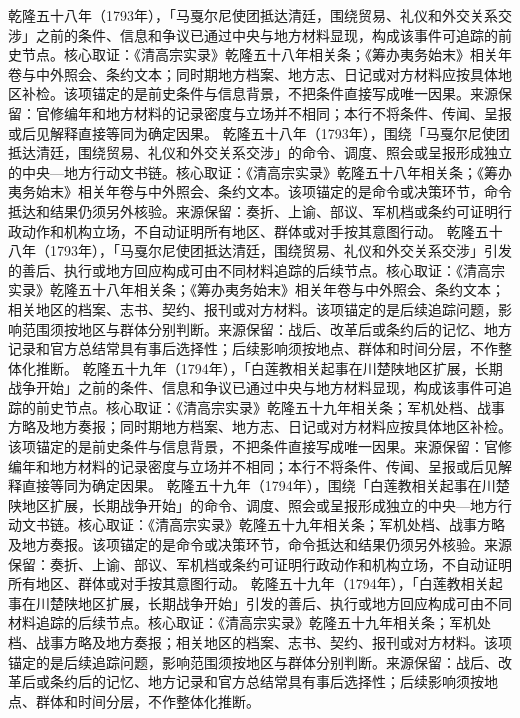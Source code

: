 乾隆五十八年（1793年），「马戛尔尼使团抵达清廷，围绕贸易、礼仪和外交关系交涉」之前的条件、信息和争议已通过中央与地方材料显现，构成该事件可追踪的前史节点。核心取证：《清高宗实录》乾隆五十八年相关条；《筹办夷务始末》相关年卷与中外照会、条约文本；同时期地方档案、地方志、日记或对方材料应按具体地区补检。该项锚定的是前史条件与信息背景，不把条件直接写成唯一因果。来源保留：官修编年和地方材料的记录密度与立场并不相同；本行不将条件、传闻、呈报或后见解释直接等同为确定因果。
乾隆五十八年（1793年），围绕「马戛尔尼使团抵达清廷，围绕贸易、礼仪和外交关系交涉」的命令、调度、照会或呈报形成独立的中央—地方行动文书链。核心取证：《清高宗实录》乾隆五十八年相关条；《筹办夷务始末》相关年卷与中外照会、条约文本。该项锚定的是命令或决策环节，命令抵达和结果仍须另外核验。来源保留：奏折、上谕、部议、军机档或条约可证明行政动作和机构立场，不自动证明所有地区、群体或对手按其意图行动。
乾隆五十八年（1793年），「马戛尔尼使团抵达清廷，围绕贸易、礼仪和外交关系交涉」引发的善后、执行或地方回应构成可由不同材料追踪的后续节点。核心取证：《清高宗实录》乾隆五十八年相关条；《筹办夷务始末》相关年卷与中外照会、条约文本；相关地区的档案、志书、契约、报刊或对方材料。该项锚定的是后续追踪问题，影响范围须按地区与群体分别判断。来源保留：战后、改革后或条约后的记忆、地方记录和官方总结常具有事后选择性；后续影响须按地点、群体和时间分层，不作整体化推断。
乾隆五十九年（1794年），「白莲教相关起事在川楚陕地区扩展，长期战争开始」之前的条件、信息和争议已通过中央与地方材料显现，构成该事件可追踪的前史节点。核心取证：《清高宗实录》乾隆五十九年相关条；军机处档、战事方略及地方奏报；同时期地方档案、地方志、日记或对方材料应按具体地区补检。该项锚定的是前史条件与信息背景，不把条件直接写成唯一因果。来源保留：官修编年和地方材料的记录密度与立场并不相同；本行不将条件、传闻、呈报或后见解释直接等同为确定因果。
乾隆五十九年（1794年），围绕「白莲教相关起事在川楚陕地区扩展，长期战争开始」的命令、调度、照会或呈报形成独立的中央—地方行动文书链。核心取证：《清高宗实录》乾隆五十九年相关条；军机处档、战事方略及地方奏报。该项锚定的是命令或决策环节，命令抵达和结果仍须另外核验。来源保留：奏折、上谕、部议、军机档或条约可证明行政动作和机构立场，不自动证明所有地区、群体或对手按其意图行动。
乾隆五十九年（1794年），「白莲教相关起事在川楚陕地区扩展，长期战争开始」引发的善后、执行或地方回应构成可由不同材料追踪的后续节点。核心取证：《清高宗实录》乾隆五十九年相关条；军机处档、战事方略及地方奏报；相关地区的档案、志书、契约、报刊或对方材料。该项锚定的是后续追踪问题，影响范围须按地区与群体分别判断。来源保留：战后、改革后或条约后的记忆、地方记录和官方总结常具有事后选择性；后续影响须按地点、群体和时间分层，不作整体化推断。
